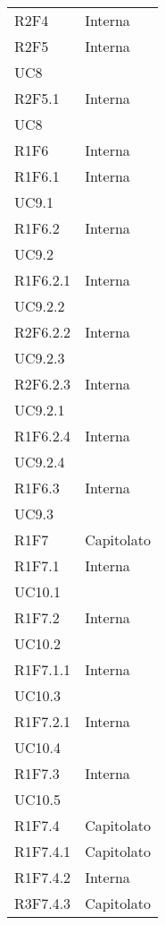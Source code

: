 \begin{longtable}{|C{6.5cm}|C{6.5cm}|}
	R2F4 &  Interna \\

	R2F5 &  \centering Interna \\ UC8 \tabularnewline

	R2F5.1 &  \centering Interna \\ UC8 \tabularnewline

	R1F6 & Interna \\

	R1F6.1 & \centering Interna \\ UC9.1 \tabularnewline

	R1F6.2 & \centering Interna \\ UC9.2 \tabularnewline

	R1F6.2.1 & \centering Interna \\ UC9.2.2 \tabularnewline

	R2F6.2.2 & \centering Interna \\ UC9.2.3 \tabularnewline

	R2F6.2.3 & \centering Interna \\ UC9.2.1 \tabularnewline

	R1F6.2.4 & \centering Interna \\ UC9.2.4 \tabularnewline

	R1F6.3 & \centering Interna \\ UC9.3 \tabularnewline

	R1F7 & Capitolato \\

	R1F7.1 & \centering Interna \\ UC10.1 \tabularnewline

	R1F7.2 &  \centering Interna \\ UC10.2 \tabularnewline

	R1F7.1.1 & \centering Interna \\ UC10.3 \tabularnewline

	R1F7.2.1 &   \centering Interna \\ UC10.4 \tabularnewline
	
	R1F7.3 & \centering Interna \\ UC10.5 \tabularnewline

	R1F7.4 &   Capitolato \\

	R1F7.4.1 &  Capitolato \\

	R1F7.4.2 &  Interna \\

	R3F7.4.3 &  Capitolato \\


\end{longtable}
